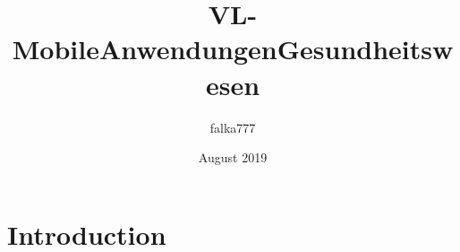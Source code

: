 \documentclass{article}
\title{VL-MobileAnwendungenGesundheitswesen}
\author{falka777 }
\date{August 2019}
\begin{document}
\maketitle

\section{Introduction}
\end{document}
